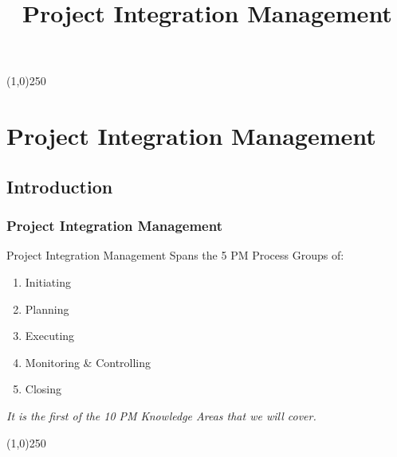 

%
\title[Project Management]{Project Integration Management}
%



%

\tableofcontents
\newpage



\begin{frame}
\titlepage
\end{frame}\begin{center}\line(1,0){250}\end{center}
%
%








\section{Project Integration Management}

\subsection{Introduction}








\begin{frame}
\frametitle{Project Integration Management}
Project Integration Management Spans the 5 PM Process Groups of:
\begin{enumerate}
	\item Initiating
	\item Planning
	\item Executing
	\item Monitoring \& Controlling
	\item Closing
\end{enumerate}
\textit{It is the first of the 10 PM Knowledge Areas that we will cover.}
\end{frame}\begin{center}\line(1,0){250}\end{center}
%
%


